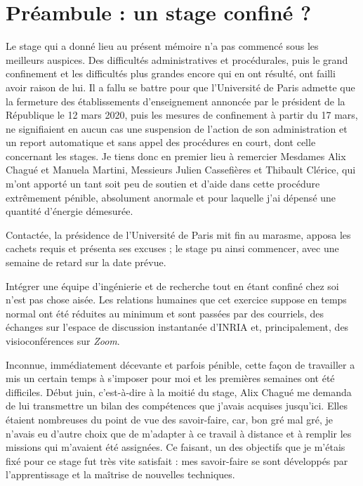 \section*{Préambule : un stage confiné ?}

Le stage qui a donné lieu au présent mémoire n'a pas commencé sous les meilleurs auspices. Des difficultés administratives et procédurales, puis le grand confinement et les difficultés plus grandes encore qui en ont résulté, ont failli avoir raison de lui. Il a fallu se battre pour que l'Université de Paris admette que la fermeture des établissements d'enseignement annoncée par le président de la République le 12 mars 2020, puis les mesures de confinement à partir du 17 mars, ne signifiaient en aucun cas une suspension de l'action de son administration et un report automatique et sans appel des procédures en court, dont celle concernant les stages. Je tiens donc en premier lieu à remercier Mesdames Alix Chagué et Manuela Martini, Messieurs Julien Cassefières et Thibault Clérice, qui m'ont apporté un tant soit peu de soutien et d'aide dans cette procédure extrêmement pénible, absolument anormale et pour laquelle j'ai dépensé une quantité d'énergie démesurée.

Contactée, la présidence de l'Université de Paris mit fin au marasme, apposa les cachets requis et présenta ses excuses ; le stage pu ainsi commencer, avec une semaine de retard sur la date prévue.

Intégrer une équipe d'ingénierie et de recherche tout en étant confiné chez soi n'est pas chose aisée. Les relations humaines que cet exercice suppose en temps normal ont été réduites au minimum et sont passées par des courriels, des échanges sur l'espace de discussion instantanée d'INRIA et, principalement, des visioconférences sur \textit{Zoom}.

Inconnue, immédiatement décevante et parfois pénible, cette façon de travailler a mis un certain temps à s'imposer pour moi et les premières semaines ont été difficiles. Début juin, c'est-à-dire à la moitié du stage, Alix Chagué me demanda de lui transmettre un bilan des compétences que j'avais acquises jusqu'ici. Elles étaient nombreuses du point de vue des savoir-faire, car, bon gré mal gré, je n'avais eu d'autre choix que de m'adapter à ce travail à distance et à remplir les missions qui m'avaient été assignées. Ce faisant, un des objectifs que je m'étais fixé pour ce stage fut très vite satisfait : mes savoir-faire se sont développés par l'apprentissage et la maîtrise de nouvelles techniques.

